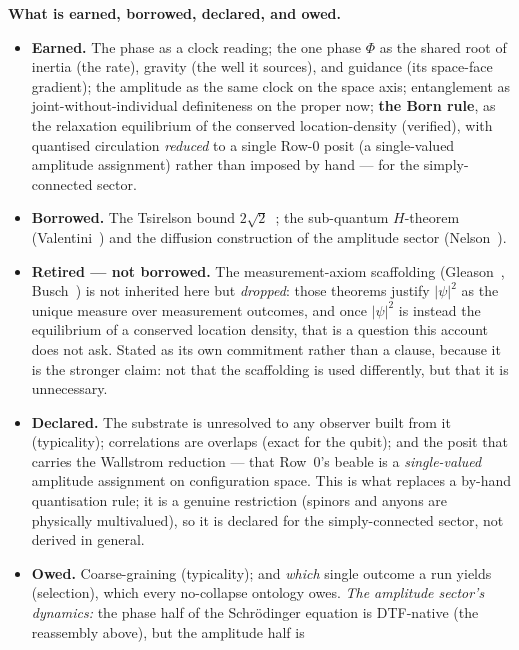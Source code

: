\documentclass[11pt]{article}
\begin{document}
\begin{tcolorbox}[keybox]
\textbf{What is earned, borrowed, declared, and owed.}
\begin{itemize}[leftmargin=1.4em,itemsep=2pt,topsep=3pt]
  \item \textbf{Earned.} The phase as a clock reading; the one phase $\Phi$ as the shared root of inertia
    (the rate), gravity (the well it sources), and guidance (its space-face gradient); the amplitude as
    the same clock on the space axis; entanglement as
    joint-without-individual definiteness on the proper now; \textbf{the Born rule}, as the relaxation
    equilibrium of the conserved location-density (verified), with quantised circulation
    \emph{reduced} to a single Row-0 posit (a single-valued amplitude assignment) rather than imposed by
    hand --- for the simply-connected sector.
  \item \textbf{Borrowed.} The Tsirelson bound $2\sqrt2$~\cite{Cirelson1980}; the sub-quantum $H$-theorem
    (Valentini~\cite{Valentini1991}) and the diffusion construction of the amplitude sector
    (Nelson~\cite{Nelson1966}).
  \item \textbf{Retired --- not borrowed.} The measurement-axiom scaffolding
    (Gleason~\cite{Gleason1957}, Busch~\cite{Busch2003}) is not inherited here but \emph{dropped}: those
    theorems justify $|\psi|^2$ as the unique measure over measurement outcomes, and once $|\psi|^2$ is
    instead the equilibrium of a conserved location density, that is a question this account does not
    ask. Stated as its own commitment rather than a clause, because it is the stronger claim: not that
    the scaffolding is used differently, but that it is unnecessary.
  \item \textbf{Declared.} The substrate is unresolved to any observer built from it (typicality);
    correlations are overlaps (exact for the qubit); and the posit that carries the Wallstrom reduction ---
    that Row~0's beable is a \emph{single-valued} amplitude assignment on configuration space. This is what
    replaces a by-hand quantisation rule; it is a genuine restriction (spinors and anyons are physically
    multivalued), so it is declared for the simply-connected sector, not derived in general.
  \item \textbf{Owed.} Coarse-graining (typicality); and \emph{which} single outcome a run yields
    (selection), which every no-collapse ontology owes. \emph{The amplitude sector's dynamics:} the phase
    half of the Schr\"odinger equation is DTF-native (the reassembly above), but the amplitude half is

\end{itemize}
\end{tcolorbox}
\end{document}
